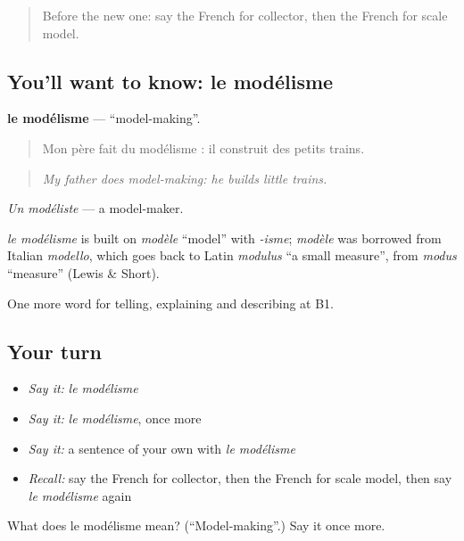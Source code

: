 \begin{quote}
Before the new one: say the French for collector, then the French for scale model.
\end{quote}

\subsection*{You'll want to know: le modélisme}
\textbf{le modélisme} — \textquotedblleft{}model-making\textquotedblright{}.

\begin{quote}
Mon père fait du modélisme : il construit des petits trains.
\end{quote}

\begin{quote}
\emph{My father does model-making: he builds little trains.}
\end{quote}

\emph{Un modéliste} — a model-maker.

\begin{cousinweb}
\emph{le modélisme} is built on \emph{modèle} \textquotedblleft{}model\textquotedblright{} with \emph{-isme}; \emph{modèle} was borrowed from Italian \emph{modello}, which goes back to Latin \emph{modulus} \textquotedblleft{}a small measure\textquotedblright{}, from \emph{modus} \textquotedblleft{}measure\textquotedblright{} (Lewis \& Short).
\end{cousinweb}

\begin{grammarlens}[title={What you've built}]
One more word for telling, explaining and describing at B1.
\end{grammarlens}

\subsection*{Your turn}
\begin{itemize}
\raggedright
  \item \emph{Say it:} \emph{le modélisme}
  \item \emph{Say it:} \emph{le modélisme}, once more
  \item \emph{Say it:} a sentence of your own with \emph{le modélisme}
  \item \emph{Recall:} say the French for collector, then the French for scale model, then say \emph{le modélisme} again
\end{itemize}

\begin{tcolorbox}[breakable,colback=teal!4,colframe=teal!35!black,title={Before you move on}]
What does le modélisme mean? (\textquotedblleft{}Model-making\textquotedblright{}.) Say it once more.
\end{tcolorbox}
